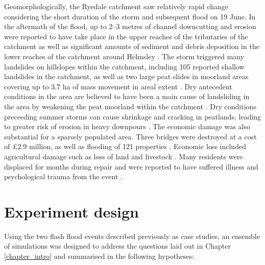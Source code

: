 Geomorphologically, the Ryedale catchment saw relatively rapid change considering the short duration of the storm and subsequent flood on 19 June. In the aftermath of the flood, up to 2--3 metres of channel downcutting and erosion were reported to have take place in the upper reaches of the tributaries of the catchment \citep{hopkins2012knowledge,wass2008investigation} as well as significant amounts of sediment and debris deposition in the lower reaches of the catchment around Helmsley \citep{hopkins2012knowledge}. The storm triggered many landslides on hillslopes within the catchment, including 105 reported shallow landslides in the catchment, as well as two large peat slides in moorland areas covering up to 3.7 ha of mass movement in areal extent \citep{galiatsatos2007assessment,wass2008investigation}. Dry antecedent conditions in the area are believed to have been a main cause of landsliding in the area by weakening the peat moorland within the catchment \citep{sibley2009analysis}. Dry conditions preceeding summer storms can cause shrinkage and cracking in peatlands, leading to greater risk of erosion in heavy downpours \citep{warburton2004hydrological}. 
The economic damage was also substantial for a sparsely populated area. Three bridges were destroyed at a cost of £2.9 million, as well as flooding of 121 properties \citep{wass2008investigation}. Economic loss included agricultural damage such as loss of land and livestock \citep{sibley2009analysis}. Many residents were displaced for months during repair and were reported to have suffered illness and psychological trauma from the event \citep{hopkins2012knowledge}.



\section{Experiment design}
\label{section_experiment_design}

Using the two flash flood events described previously as case studies, an ensemble of simulations was designed to address the questions laid out in Chapter \ref{chapter_intro} and summarised in the following hypotheses:

